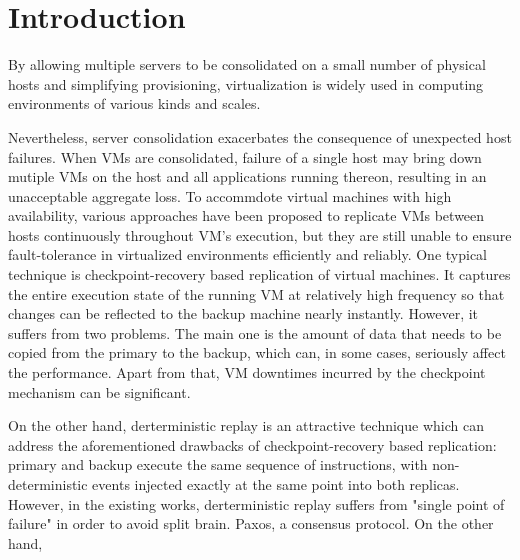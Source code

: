 \section{Introduction} \label{sec:intro}

By allowing multiple servers to be consolidated on a small number of physical hosts 
and simplifying provisioning, virtualization is widely used in computing environments 
of various kinds and scales.

Nevertheless, server consolidation exacerbates the consequence of unexpected host failures. 
When VMs are consolidated, failure of a single host may bring down mutiple VMs on the host 
and all applications running thereon, resulting in an unacceptable aggregate loss. 
To accommdote virtual machines with high availability, various approaches have been 
proposed to replicate VMs between hosts continuously throughout VM's execution, but 
they are still unable to ensure fault-tolerance in virtualized environments efficiently 
and reliably. One typical technique is checkpoint-recovery based replication of virtual 
machines. It captures the entire execution state of the running VM at relatively 
high frequency so that changes can be reflected to the backup machine nearly instantly. 
However, it suffers from two problems. The main one is the amount of data that needs to be 
copied from the primary to the backup, which can, in some cases, seriously affect the performance. 
Apart from that, VM downtimes incurred by the checkpoint mechanism can be significant.

% 
On the other hand, derterministic replay is an attractive technique which can address the 
aforementioned drawbacks of checkpoint-recovery based replication: primary and backup execute 
the same sequence of instructions, with non-deterministic events injected exactly at the same 
point into both replicas. However, in the existing works, derterministic replay suffers from 
"single point of failure" in order to avoid split brain.
Paxos, a consensus protocol. 
On the other hand, 

